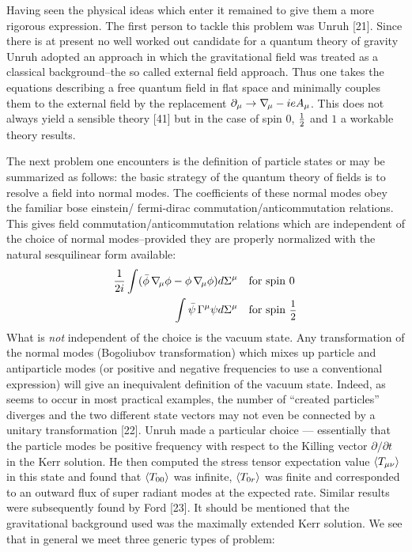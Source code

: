 Having seen the physical ideas which enter it remained to give them a
more rigorous expression. The first person to tackle this problem was
Unruh [21]. Since there is at present no well worked out candidate for a quantum theory
of gravity Unruh adopted an approach in which the gravitational field was treated as
a classical background--the so called external field approach. Thus one takes
the equations describing a free quantum field in flat space and minimally
couples them to the external field by the replacement $\partial_\mu \to \grad_\mu - ieA_\mu$.
This does not always yield a sensible theory [41] but in the case of spin 0, $\small{\frac{1}{2}}$ and $1$ a workable
theory results.

The next problem one encounters is the definition of particle states or may
be summarized as follows: the basic strategy of the quantum theory of fields 
is to resolve a field into normal modes. The coefficients
of these normal modes obey the familiar bose einstein/ fermi-dirac commutation/anticommutation
relations. This gives field commutation/anticommutation relations which are independent
of the choice of normal modes--provided they are properly normalized with the
natural sesquilinear form available:
\begin{align}
\frac{1}{2i} \int (\bar\phi\grad_\mu\phi - \phi\grad_\mu\phi) d\Sigma^\mu \quad & \text{for spin 0}\\
\int \bar\psi\GG^\mu\psi d\Sigma^\mu \quad & \text{for spin \small$\half$}
\end{align}
What is {\it not} independent of the choice is the vacuum state. Any transformation
of the normal modes (Bogoliubov transformation) which mixes up particle and
antiparticle modes (or positive and negative frequencies to use a conventional expression)
will give an inequivalent definition of the vacuum state. Indeed, as
seems to occur in most practical examples, the number of ``created particles'' diverges and
the two different state vectors may not even be connected by a unitary transformation [22].
Unruh made a particular choice --- essentially that the particle modes be positive
frequency with respect to the Killing vector $\partial/\partial t$ in the Kerr solution.
He then computed the stress tensor expectation value $\langle T_{\mu\nu} \rangle$ in this state and found
that $\langle T_{00} \rangle$ was infinite, $\langle T_{0r} \rangle$ was finite and corresponded to an outward flux of
super radiant modes at the expected rate. Similar results were subsequently found by Ford [23].
It should be mentioned that the gravitational background used was the maximally
extended Kerr solution. We see that in general we meet three generic types of problem:
